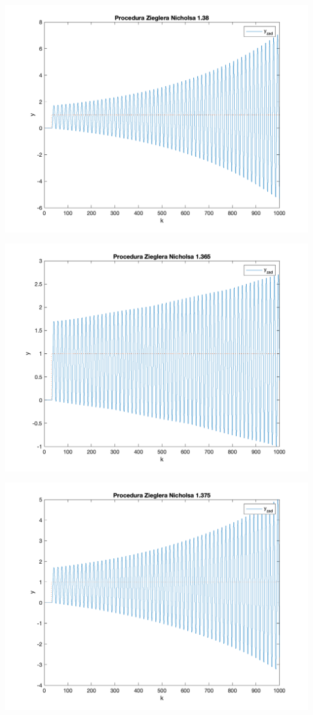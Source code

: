\documentclass[a4paper, 11pt]{article}
\begin{document}
\begin{enumerate}
 \includegraphics[width=\linewidth]{./ModelsP3/ZN/P2_K138png.png} 
 
 \includegraphics[width=\linewidth]{./ModelsP3/ZN/P2_K1365png.png} 
 
 \includegraphics[width=\linewidth]{./ModelsP3/ZN/P2_K1375png.png} 
 

\end{enumerate}
\end{document}
